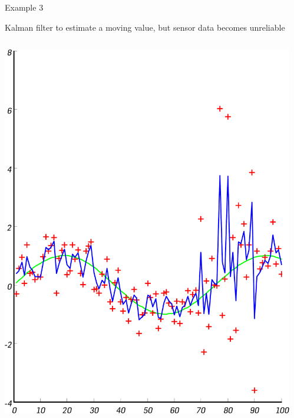 \documentclass[compress]{beamer}
\begin{document}

\begin{frame}{Example 3}

  Kalman filter to estimate a moving value, but sensor data becomes
  unreliable

    \begin{columns}
        \begin{column}{0.5\linewidth}
            \begin{center}
                \includegraphics[width=0.8\linewidth]{kalman3}
            \end{center}
        \end{column}
        \begin{column}{0.5\linewidth}
            \begin{center}

\end{center}
\end{column}
\end{columns}
\end{frame}
\end{document}
